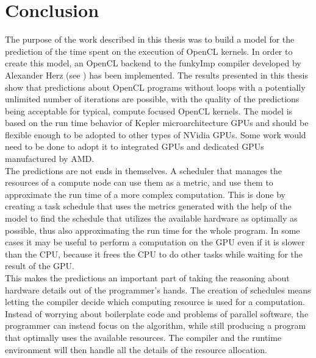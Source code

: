 
\chapter{Conclusion}
\label{chap:conclusion}

The purpose of the work described in this thesis was to build a model for the prediction of the time spent on the execution of OpenCL kernels. In order to create this model, an OpenCL backend to the funkyImp compiler developed by Alexander Herz (see \cite{herz2013funkywiki}) has been implemented. The results presented in this thesis show that predictions about OpenCL programs without loops with a potentially unlimited number of iterations are possible, with the quality of the predictions being acceptable for typical, compute focused OpenCL kernels. The model is based on the run time behavior of Kepler microarchitecture GPUs and should be flexible enough to be adopted to other types of NVidia GPUs. Some work would need to be done to adopt it to integrated GPUs and dedicated GPUs manufactured by AMD. \\

The predictions are not ends in themselves. A scheduler that manages the resources of a compute node can use them as a metric, and use them to approximate the run time of a more complex computation. This is done by creating a task schedule that uses the metrics generated with the help of the model to find the schedule that utilizes the available hardware as optimally as possible, thus also approximating the run time for the whole program. In some cases it may be useful to perform a computation on the GPU even if it is slower than the CPU, because it frees the CPU to do other tasks while waiting for the result of the GPU.\\

This makes the predictions an important part of taking the reasoning about hardware details out of the programmer's hands. The creation of schedules means letting the compiler decide which computing resource is used for a computation. Instead of worrying about boilerplate code and problems of parallel software, the programmer can instead focus on the algorithm, while still producing a program that optimally uses the available resources. The compiler and the runtime environment will then handle all the details of the resource allocation.
